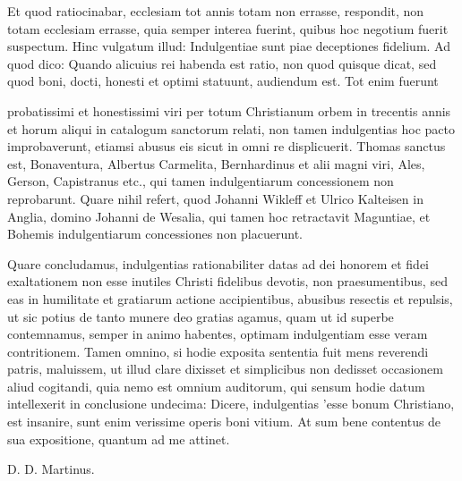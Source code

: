 Et quod ratiocinabar, ecclesiam tot annis totam non errasse, respondit, non totam ecclesiam errasse, quia semper interea fuerint, quibus hoc negotium fuerit suspectum. Hinc vulgatum illud: Indulgentiae sunt piae deceptiones fidelium. Ad quod dico: Quando alicuius rei habenda est ratio, non quod quisque dicat, sed quod boni, docti, honesti et optimi statuunt, audiendum est. Tot enim fuerunt

probatissimi et honestissimi viri per totum Christianum orbem in trecentis annis et horum aliqui in catalogum sanctorum relati, non tamen indulgentias hoc pacto improbaverunt, etiamsi abusus eis sicut in omni re displicuerit. Thomas sanctus est, Bonaventura, Albertus Carmelita, Bernhardinus et alii magni viri, Ales, Gerson, Capistranus etc., qui tamen indulgentiarum concessionem non reprobarunt. Quare nihil refert, quod Johanni Wikleff et Ulrico Kalteisen in Anglia, domino Johanni de Wesalia, qui tamen hoc retractavit Maguntiae, et Bohemis indulgentiarum concessiones non placuerunt.

Quare concludamus, indulgentias rationabiliter datas ad dei honorem et fidei exaltationem non esse inutiles Christi fidelibus devotis, non praesumentibus, sed eas in humilitate et gratiarum actione accipientibus, abusibus resectis et repulsis, ut sic potius de tanto munere deo gratias agamus, quam ut id superbe contemnamus, semper in animo habentes, optimam indulgentiam esse veram contritionem. Tamen omnino, si hodie exposita sententia fuit mens reverendi patris, maluissem, ut illud clare dixisset et simplicibus non dedisset occasionem aliud cogitandi, quia nemo est omnium auditorum, qui sensum hodie datum intellexerit in conclusione undecima: Dicere, indulgentias 'esse bonum Christiano, est insanire, sunt enim verissime operis boni vitium. At sum bene contentus de sua expositione, quantum ad me attinet.

D. D. Martinus.

